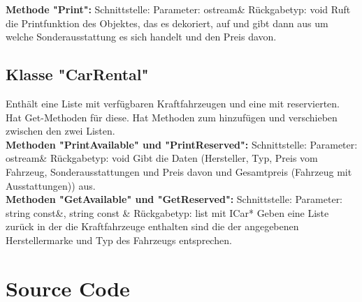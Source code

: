 \documentclass[12pt,a4paper]{article}
\begin{document}
\textbf {Methode "Print": } 
\newline
Schnittstelle:
\newline
Parameter: ostream\&
\newline
Rückgabetyp: void
\newline
Ruft die Printfunktion des Objektes, das es dekoriert, auf und gibt dann aus um welche Sonderausstattung es sich handelt und den Preis davon.
\\

\subsection {Klasse "CarRental"}
Enthält eine Liste mit verfügbaren Kraftfahrzeugen und eine mit reservierten. Hat Get-Methoden für diese. Hat Methoden zum hinzufügen und verschieben zwischen den zwei Listen.
\\

\textbf {Methoden "PrintAvailable" und "PrintReserved": } 
\newline
Schnittstelle:
\newline
Parameter: ostream\&
\newline
Rückgabetyp: void
\newline
Gibt die Daten (Hersteller, Typ, Preis vom Fahrzeug, Sonderausstattungen und Preis davon und Gesamtpreis (Fahrzeug mit Ausstattungen)) aus.
\\

\textbf {Methoden "GetAvailable" und "GetReserved": } 
\newline
Schnittstelle:
\newline
Parameter: string const\&, string const \&
\newline
Rückgabetyp: list mit ICar*
\newline
Geben eine Liste zurück in der die Kraftfahrzeuge enthalten sind die der angegebenen Herstellermarke und Typ des Fahrzeugs entsprechen.
\\

\newpage
\section {Source Code}



\newpage


\newpage


\newpage

\newpage
\end{document}
